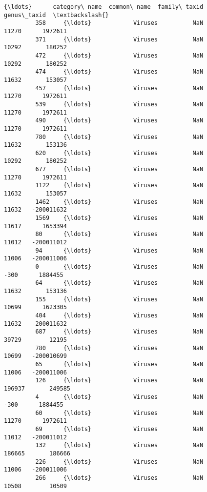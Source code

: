 \documentclass[11pt]{article}
\begin{document}
\begin{Verbatim}[commandchars=\\\{\}]
                 {\ldots}      category\_name  common\_name  family\_taxid  genus\_taxid  \textbackslash{}
         358     {\ldots}            Viruses          NaN         11270      1972611   
         371     {\ldots}            Viruses          NaN         10292       180252   
         472     {\ldots}            Viruses          NaN         10292       180252   
         474     {\ldots}            Viruses          NaN         11632       153057   
         457     {\ldots}            Viruses          NaN         11270      1972611   
         539     {\ldots}            Viruses          NaN         11270      1972611   
         490     {\ldots}            Viruses          NaN         11270      1972611   
         780     {\ldots}            Viruses          NaN         11632       153136   
         620     {\ldots}            Viruses          NaN         10292       180252   
         677     {\ldots}            Viruses          NaN         11270      1972611   
         1122    {\ldots}            Viruses          NaN         11632       153057   
         1462    {\ldots}            Viruses          NaN         11632   -200011632   
         1569    {\ldots}            Viruses          NaN         11617      1653394   
         80      {\ldots}            Viruses          NaN         11012   -200011012   
         94      {\ldots}            Viruses          NaN         11006   -200011006   
         0       {\ldots}            Viruses          NaN          -300      1884455   
         64      {\ldots}            Viruses          NaN         11632       153136   
         155     {\ldots}            Viruses          NaN         10699      1623305   
         404     {\ldots}            Viruses          NaN         11632   -200011632   
         687     {\ldots}            Viruses          NaN         39729        12195   
         780     {\ldots}            Viruses          NaN         10699   -200010699   
         65      {\ldots}            Viruses          NaN         11006   -200011006   
         126     {\ldots}            Viruses          NaN        196937       249585   
         4       {\ldots}            Viruses          NaN          -300      1884455   
         60      {\ldots}            Viruses          NaN         11270      1972611   
         69      {\ldots}            Viruses          NaN         11012   -200011012   
         132     {\ldots}            Viruses          NaN        186665       186666   
         226     {\ldots}            Viruses          NaN         11006   -200011006   
         266     {\ldots}            Viruses          NaN         10508        10509   

\end{Verbatim}
\end{document}
